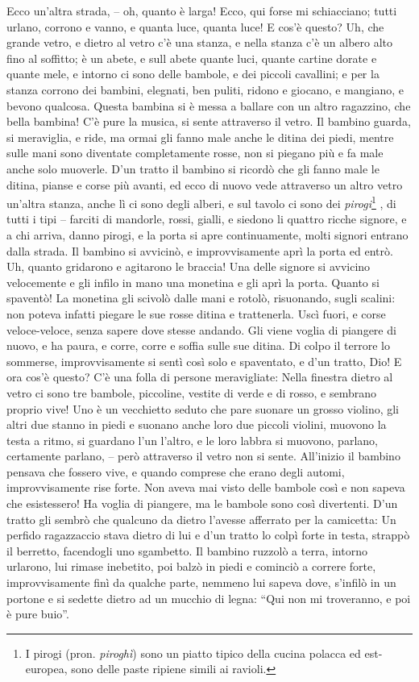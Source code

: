 \documentclass[a4paper, 12pt]{article}
\begin{document}
\begin{linenumbers}
	Ecco un'altra strada, -- oh, quanto è larga!
	Ecco, qui forse mi schiacciano;
	tutti urlano, corrono e vanno, e quanta luce, quanta luce!
	E cos'è questo?
	Uh, che grande vetro, e dietro al vetro c'è una stanza, e nella stanza c'è un albero alto fino al soffitto;
	è un abete, e sull abete quante luci, quante cartine dorate e quante mele, e intorno ci sono delle bambole, e dei piccoli cavallini;
	e per la stanza corrono dei bambini, elegnati, ben puliti, ridono e giocano, e mangiano, e bevono qualcosa.
	Questa bambina si è messa a ballare con un altro ragazzino, che bella bambina!
	C'è pure la musica, si sente attraverso il vetro.
	Il bambino guarda, si meraviglia, e ride, ma ormai gli fanno male anche le ditina dei piedi, mentre sulle mani sono diventate completamente rosse, non si piegano più e fa male anche solo muoverle.
	D'un tratto il bambino si ricordò che gli fanno male le ditina, pianse e corse più avanti, ed ecco di nuovo vede attraverso un altro vetro un'altra stanza, anche lì ci sono degli alberi, e sul tavolo ci sono dei \textit{pirogi}\footnote{I pirogi (pron. \textit{piroghì}) sono un piatto tipico della cucina polacca ed est-europea, sono delle paste ripiene simili ai ravioli.} , di tutti i tipi -- farciti di mandorle, rossi, gialli, e siedono li quattro ricche signore, e a chi arriva, danno pirogi, e la porta si apre continuamente, molti signori entrano dalla strada.
	Il bambino si avvicinò, e improvvisamente aprì la porta ed entrò.
	Uh, quanto gridarono e agitarono le braccia!
	Una delle signore si avvicino velocemente e gli infilo in mano una monetina e gli aprì la porta.
	Quanto si spaventò!
	La monetina gli scivolò dalle mani e rotolò, risuonando, sugli scalini: non poteva infatti piegare le sue rosse ditina e trattenerla.
	Uscì fuori, e corse veloce-veloce, senza sapere dove stesse andando.
	Gli viene voglia di piangere di nuovo, e ha paura, e corre, corre e soffia sulle sue ditina.
	Di colpo il terrore lo sommerse, improvvisamente si sentì così solo e spaventato, e d'un tratto, Dio!
	E ora cos'è questo?
	C'è una folla di persone meravigliate:
	Nella finestra dietro al vetro ci sono tre bambole, piccoline, vestite di verde e di rosso, e sembrano proprio vive!
	Uno è un vecchietto seduto che pare suonare un grosso violino, gli altri due stanno in piedi e suonano anche loro due piccoli violini, muovono la testa a ritmo, si guardano l'un l'altro, e le loro labbra si muovono, parlano, certamente parlano, -- però attraverso il vetro non si sente.
	All'inizio il bambino pensava che fossero vive, e quando comprese che erano degli automi, improvvisamente rise forte.
	Non aveva mai visto delle bambole così e non sapeva che esistessero!
	Ha voglia di piangere, ma le bambole sono così divertenti.
	D'un tratto gli sembrò che qualcuno da dietro l'avesse afferrato per la camicetta:
	Un perfido ragazzaccio stava dietro di lui e d'un tratto lo colpì forte in testa, strappò il berretto, facendogli uno sgambetto.
	Il bambino ruzzolò a terra, intorno urlarono, lui rimase inebetito, poi balzò in piedi e cominciò a correre forte, improvvisamente finì da qualche parte, nemmeno lui sapeva dove, s'infilò in un portone e si sedette dietro ad un mucchio di legna: ``Qui non mi troveranno, e poi è pure buio''.
	

\end{linenumbers}
\end{document}
